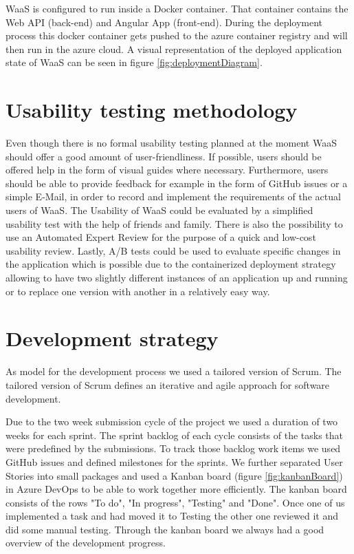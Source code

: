 \documentclass[titlepage, 12pt]{article}
\begin{document}
WaaS is configured to run inside a Docker container. That container contains the Web API (back-end) and Angular App (front-end). During the deployment process this docker container gets pushed to the azure container registry and will then run in the azure cloud. A visual representation of the deployed application state of WaaS can be seen in figure \ref{fig:deploymentDiagram}.


\section {Usability testing methodology}
Even though there is no formal usability testing planned at the moment WaaS should offer a good amount of user-friendliness.
If possible, users should be offered help in the form of visual guides where necessary.
Furthermore, users should be able to provide feedback for example in the form of GitHub issues or a simple E-Mail, in order to record and implement the requirements of the actual users of WaaS.
The Usability of WaaS could be evaluated by a simplified usability test with the help of friends and family.
There is also the possibility to use an Automated Expert Review for the purpose of a quick and low-cost usability review.
Lastly, A/B tests could be used to evaluate specific changes in the application which is possible due to the containerized deployment strategy allowing to have two slightly different
instances of an application up and running or to replace one version with another in a relatively easy way.

\section{Development strategy}

As model for the development process we used a tailored version of Scrum. The tailored version of Scrum defines an iterative and agile approach for software development.

Due to the two week submission cycle of the project we used a duration of two weeks for each sprint. The sprint backlog of each cycle consists of the tasks that were predefined by the submissions. To track those backlog work items we used GitHub issues and defined milestones for the sprints. We further separated User Stories into small packages and used a Kanban board (figure \ref{fig:kanbanBoard}) in Azure DevOps to be able to work together more efficiently. The kanban board consists of the rows "To do", "In progress", "Testing" and "Done". Once one of us implemented a task and had moved it to Testing the other one reviewed it and did some manual testing. Through the kanban board we always had a good overview of the development progress. 
\end{document}
